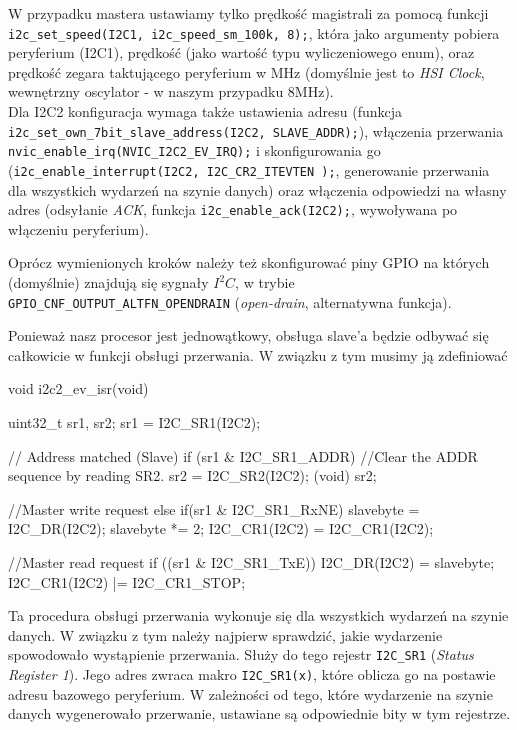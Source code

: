 \documentclass{pdfBooklets}
\begin{document}
W przypadku mastera ustawiamy tylko prędkość magistrali za pomocą funkcji
\Verb$i2c_set_speed(I2C1, i2c_speed_sm_100k, 8);$, która jako argumenty pobiera peryferium (I2C1), prędkość (jako wartość typu wyliczeniowego enum),
oraz prędkość zegara taktującego peryferium w MHz (domyślnie jest to \textit{HSI Clock}, wewnętrzny oscylator - w naszym przypadku 8MHz).\\

Dla I2C2 konfiguracja wymaga także ustawienia adresu (funkcja \Verb$i2c_set_own_7bit_slave_address(I2C2, SLAVE_ADDR);$), włączenia przerwania
\Verb$nvic_enable_irq(NVIC_I2C2_EV_IRQ);$ i skonfigurowania go (\Verb$i2c_enable_interrupt(I2C2, I2C_CR2_ITEVTEN );$, generowanie przerwania dla wszystkich wydarzeń na szynie danych) oraz włączenia odpowiedzi na własny adres (odsyłanie \textit{ACK}, funkcja \Verb$i2c_enable_ack(I2C2);$,
wywoływana po włączeniu peryferium).

Oprócz wymienionych kroków należy też skonfigurować piny GPIO na których (domyślnie) znajdują się sygnały $I^2C$, w trybie
\Verb$GPIO_CNF_OUTPUT_ALTFN_OPENDRAIN$ (\textit{open-drain}, alternatywna funkcja).

Ponieważ nasz procesor jest jednowątkowy, obsługa slave'a będzie odbywać się całkowicie w funkcji obsługi przerwania. W związku z tym musimy ją
zdefiniować

\begin{CodeFrame*}[c]{}
void i2c2_ev_isr(void){
  
  uint32_t sr1, sr2;
  sr1 = I2C_SR1(I2C2);

  // Address matched (Slave)
  if (sr1 & I2C_SR1_ADDR){
    //Clear the ADDR sequence by reading SR2.
    sr2 = I2C_SR2(I2C2);
    (void) sr2;	
  }

  //Master write request
  else if(sr1 & I2C_SR1_RxNE){
    slavebyte = I2C_DR(I2C2);
    slavebyte *= 2;
    I2C_CR1(I2C2) = I2C_CR1(I2C2);
  }
  
  //Master read request
  if ((sr1 & I2C_SR1_TxE)){
    I2C_DR(I2C2) = slavebyte;
    I2C_CR1(I2C2) |= I2C_CR1_STOP;
  }
}
\end{CodeFrame*}

Ta procedura obsługi przerwania wykonuje się dla wszystkich wydarzeń na szynie danych. W związku z tym należy najpierw sprawdzić, jakie wydarzenie
spowodowało wystąpienie przerwania. Służy do tego rejestr \Verb$I2C_SR1$ (\textit{Status Register 1}). Jego adres zwraca makro \Verb$I2C_SR1(x)$,
które oblicza go na postawie adresu bazowego peryferium. W zależności od tego, które wydarzenie na szynie danych wygenerowało przerwanie, ustawiane
są odpowiednie bity w tym rejestrze.\\
\end{document}
